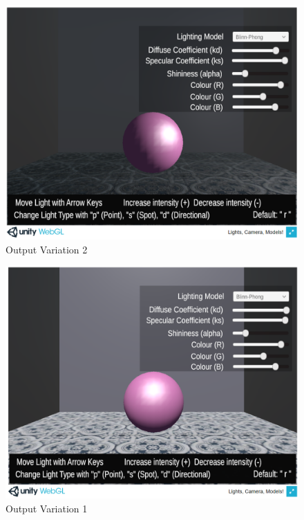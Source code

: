 \documentclass[12pt, titlepage]{article}
\begin{document}
\begin{enumerate}
	\begin{figure}[h]
		\centering
		\includegraphics[scale=0.25]{./images/fromVnVPlan/sphere-lit-point-moveBoundsR}
		\caption{Output Variation 2}
		\label{fig:point-bounds-right}
	\end{figure}	
	
	\begin{figure}[h]
		\centering
		\includegraphics[scale=0.25]{./images/fromVnVPlan/sphere-lit-direction}
		\caption{Output Variation 1}
		\label{fig:directional-bounds-right}
	\end{figure}
	

\end{enumerate}
\end{document}
